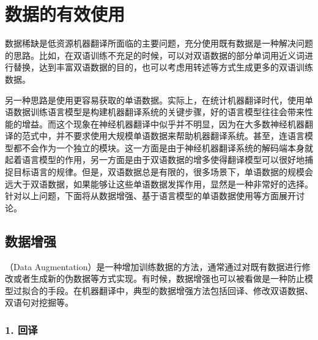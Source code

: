 \section{数据的有效使用}\label{effective-use-of-data}

\parinterval 数据稀缺是低资源机器翻译所面临的主要问题，充分使用既有数据是一种解决问题的思路。比如，在双语训练不充足的时候，可以对双语数据的部分单词用近义词进行替换，达到丰富双语数据的目的，也可以考虑用转述等方式生成更多的双语训练数据。

\parinterval 另一种思路是使用更容易获取的单语数据。实际上，在统计机器翻译时代，使用单语数据训练语言模型是构建机器翻译系统的关键步骤，好的语言模型往往会带来性能的增益。而这个现象在神经机器翻译中似乎并不明显，因为在大多数神经机器翻译的范式中，并不要求使用大规模单语数据来帮助机器翻译系统。甚至，连语言模型都不会作为一个独立的模块。这一方面是由于神经机器翻译系统的解码端本身就起着语言模型的作用，另一方面是由于双语数据的增多使得翻译模型可以很好地捕捉目标语言的规律。但是，双语数据总是有限的，很多场景下，单语数据的规模会远大于双语数据，如果能够让这些单语数据发挥作用，显然是一种非常好的选择。针对以上问题，下面将从数据增强、基于语言模型的单语数据使用等方面展开讨论。

\subsection{数据增强}

（Data Augmentation）是一种增加训练数据的方法，通常通过对既有数据进行修改或者生成新的伪数据等方式实现。有时候，数据增强也可以被看做是一种防止模型过拟合的手段。在机器翻译中，典型的数据增强方法包括回译、修改双语数据、双语句对挖掘等。

\subsubsection{1. 回译}

